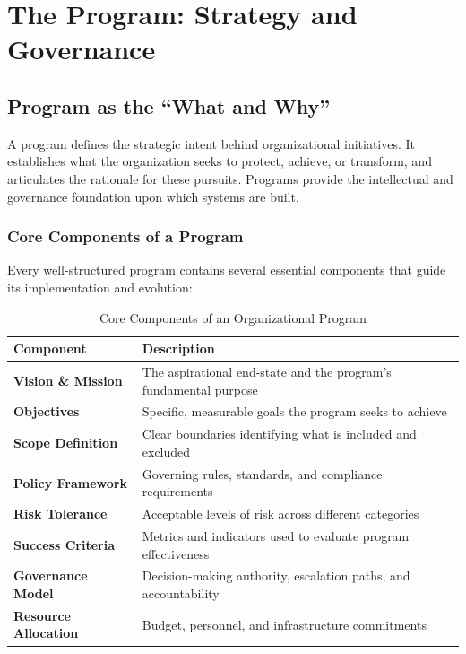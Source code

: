 \documentclass[11pt,letterpaper]{article}
\begin{document}
\section{The Program: Strategy and Governance}

\subsection{Program as the ``What and Why''}

A program defines the strategic intent behind organizational initiatives. It establishes what the organization seeks to protect, achieve, or transform, and articulates the rationale for these pursuits. Programs provide the intellectual and governance foundation upon which systems are built.

\subsubsection{Core Components of a Program}

Every well-structured program contains several essential components that guide its implementation and evolution:

\begin{table}[H]
\centering
\renewcommand{\arraystretch}{1.3}
\begin{tabularx}{\textwidth}{>{\bfseries}l >{\raggedright\arraybackslash}X}
\toprule
\textbf{Component} & \textbf{Description} \\
\midrule
Vision \& Mission & The aspirational end-state and the program's fundamental purpose \\
Objectives & Specific, measurable goals the program seeks to achieve \\
Scope Definition & Clear boundaries identifying what is included and excluded \\
Policy Framework & Governing rules, standards, and compliance requirements \\
Risk Tolerance & Acceptable levels of risk across different categories \\
Success Criteria & Metrics and indicators used to evaluate program effectiveness \\
Governance Model & Decision-making authority, escalation paths, and accountability \\
Resource Allocation & Budget, personnel, and infrastructure commitments \\
\bottomrule
\end{tabularx}
\caption{Core Components of an Organizational Program}
\label{tab:program-components}
\end{table}
\end{document}
